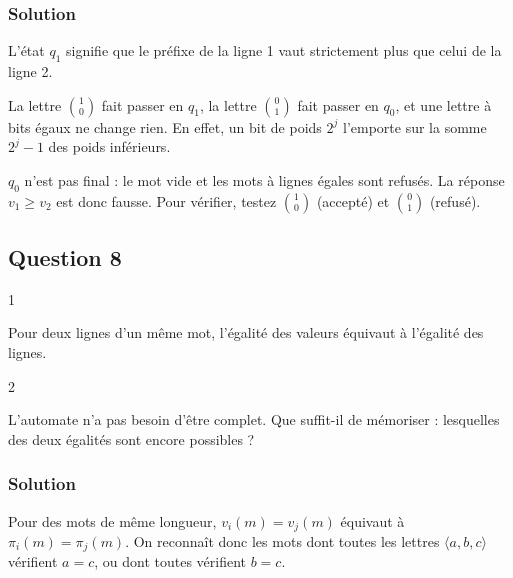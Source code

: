 \documentclass[11pt,a4paper]{article}
\newcommand{\equationajustee}[1]{%
  \sbox{\boiteequation}{$\displaystyle #1$}%
  \ifdim\wd\boiteequation>\linewidth
    \[\resizebox{\linewidth}{!}{\usebox{\boiteequation}}\]%
  \else
    \[#1\]%
  \fi}
\begin{document}
\hypertarget{solution-6}{%
\subsubsection{Solution}\label{solution-6}}

\equationajustee{\boxed{\mathcal{L}({\mathcal{A}}_2)=\{m\in\Sigma_2^*:\ v_1(m)>v_2(m)\}}}

L'état \(q_1\) signifie que le préfixe de la ligne 1 vaut strictement plus que celui de la ligne 2.

La lettre \(\binom10\) fait passer en \(q_1\), la lettre \(\binom01\) fait passer en \(q_0\), et une lettre à bits égaux ne change rien. En effet, un bit de poids \(2^j\) l'emporte sur la somme \(2^j-1\) des poids inférieurs.

\begin{piege}

\(q_0\) n'est pas final : le mot vide et les mots à lignes égales sont refusés. La réponse \(v_1\ge v_2\) est donc fausse. Pour vérifier, testez \(\binom10\) (accepté) et \(\binom01\) (refusé).

\end{piege}

\hypertarget{question-8}{%
\subsection{Question 8}\label{question-8}}

\begin{indication}{1}

Pour deux lignes d'un même mot, l'égalité des valeurs équivaut à l'égalité des lignes.

\end{indication}

\begin{indication}{2}

L'automate n'a pas besoin d'être complet. Que suffit-il de mémoriser : lesquelles des deux égalités sont encore possibles ?

\end{indication}

\hypertarget{solution-7}{%
\subsubsection{Solution}\label{solution-7}}

Pour des mots de même longueur, \(v_i(m)=v_j(m)\) équivaut à \(\pi_i(m)=\pi_j(m)\). On reconnaît donc les mots dont toutes les lettres \(\langle a,b,c\rangle\) vérifient \(a=c\), ou dont toutes vérifient \(b=c\).
\end{document}
